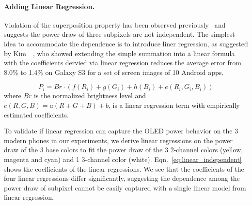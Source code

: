 

\paragraph{Adding Linear Regression.}
\label{subsec:LMLR}
Violation of the superposition property has been observed
previously~\cite{mittal2012empowering,kim2013runtime}
and suggests the power draw of three subpixels
are not independent.
The simplest idea to accommodate the dependence is to introduce liner regression,
as suggested by Kim~\etal~\cite{kim2013runtime},
who showed extending the
simple summation into a linear formula with the coefficients dervied
via linear regression reduces the average error from 8.0\% to 1.4\% on
Galaxy S3 for a set of screen images of 10 Android apps.

\begin{equation}
P_i = Br\cdot(f(R_{i}) + g(G_{i}) + h(B_{i}) + e(R_{i},G_{i},B_{i}))
\label{eq:linear_equation2}
\end{equation}
\noindent
where $Br$ is the normalized brightness level and $e(R,G,B)= a(R+G+B)
+ b$, is a linear regression term with empirically estimated
coefficients. \
\fi

To validate if linear regression can capture the OLED power behavior
on the 3 modern phones in our experiments, we derive linear
regressions on the power draw of the 3 base colors to fit the power
draw of the 3 2-channel colors (yellow, magenta and cyan) and 1 3-channel color (white).
Eqn.~\ref{eq:linear_independent} shows the coefficients of the linear
regressions.  We see that the coefficients of the four linear
regressions differ significantly, suggesting the dependence among the
power draw of subpixel cannot be easily captured with a single linear
model from linear regression.

